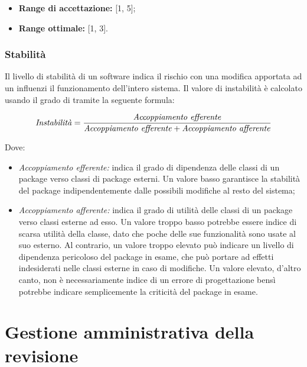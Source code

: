 \documentclass[openany,12pt,a4paper]{report}
\begin{document}
\begin{itemize}
    \item \textbf{Range di accettazione:} [1, 5];
    
    \item \textbf{Range ottimale:} [1, 3].
\end{itemize}

\subsection{Stabilità}

Il livello di stabilità di un software indica il rischio con una modifica apportata ad un  influenzi il funzionamento dell'intero sistema. Il valore di instabilità è calcolato usando il grado di  tramite la seguente formula:

\[ \textrm{\textit{Instabilità}} = \frac{\textrm{\textit{Accoppiamento efferente}}}{\textrm{\textit{Accoppiamento efferente}} + \textrm{\textit{Accoppiamento afferente}}} \]

Dove:

\begin{itemize}
    \item \textit{Accoppiamento efferente:} indica il grado di dipendenza delle classi di un package verso classi di package esterni. Un valore basso garantisce la stabilità del package indipendentemente dalle possibili modifiche al resto del sistema;
    
    \item \textit{Accoppiamento afferente:} indica il grado di utilità delle classi di un package verso classi esterne ad esso. Un valore troppo basso potrebbe essere indice di scarsa utilità della classe, dato che poche delle sue funzionalità sono usate al suo esterno. Al contrario, un valore troppo elevato può indicare un livello di dipendenza pericoloso del package in esame, che può portare ad effetti indesiderati nelle classi esterne in caso di modifiche. Un valore elevato, d'altro canto, non è necessariamente indice di un errore di progettazione bensì potrebbe indicare semplicemente la criticità del package in esame.
\end{itemize}


\chapter{Gestione amministrativa della revisione}
\end{document}
